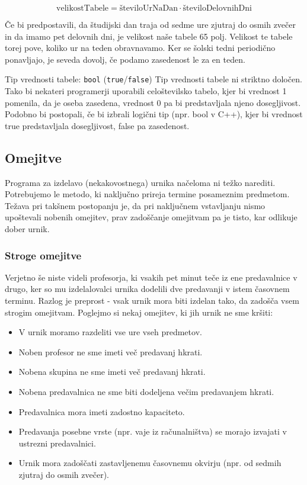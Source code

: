\documentclass[10pt,a4paper]{article}
\begin{document}
\[
\text{velikostTabele} = \text{številoUrNaDan} \cdot \text{številoDelovnihDni}
\]


Če bi predpostavili, da študijski dan traja od sedme ure zjutraj do osmih zvečer in da
imamo pet delovnih dni, je velikost naše tabele 65 polj. Velikost te tabele torej pove,
koliko ur na teden obravnavamo. Ker se šolski tedni periodično ponavljajo, je seveda
dovolj, če podamo zasedenost le za en teden.


Tip vrednosti tabele: \texttt{bool} (\texttt{true}/\texttt{false})
Tip vrednosti tabele ni striktno določen. Tako bi nekateri programerji uporabili
celoštevilsko tabelo, kjer bi vrednost 1 pomenila, da je oseba zasedena, vrednost 0
pa bi predstavljala njeno dosegljivost. Podobno bi postopali, če bi izbrali logični
tip (npr. bool v C++), kjer bi vrednost true predstavljala
dosegljivost, false pa zasedenost.

\subsection{Omejitve} %

Programa za izdelavo (nekakovostnega) urnika načeloma ni težko narediti. Potrebujemo
le metodo, ki naključno prireja termine posameznim predmetom. Težava pri takšnem postopanju
je, da pri naključnem vstavljanju nismo upoštevali nobenih omejitev, prav zadoščanje omejitvam
pa je tisto, kar odlikuje dober urnik.

\subsubsection{Stroge omejitve} %

Verjetno še niste videli profesorja, ki vsakih pet minut teče iz ene predavalnice v drugo,
ker so mu izdelalovalci urnika dodelili dve predavanji v istem časovnem terminu. Razlog
je preprost - vsak urnik mora biti izdelan tako, da zadošča vsem strogim omejitvam.
Poglejmo si nekaj omejitev, ki jih urnik ne sme kršiti:

\begin{itemize}
 \item   V urnik moramo razdeliti vse ure vseh predmetov.
 \item   Noben profesor ne sme imeti več predavanj hkrati.
 \item   Nobena skupina ne sme imeti več predavanj hkrati.
 \item   Nobena predavalnica ne sme biti dodeljena večim predavanjem hkrati.
 \item   Predavalnica mora imeti zadostno kapaciteto.
 \item   Predavanja posebne vrste (npr. vaje iz računalništva) se morajo izvajati v ustrezni predavalnici.
 \item   Urnik mora zadoščati zastavljenemu časovnemu okvirju (npr. od sedmih zjutraj do osmih zvečer).

\end{itemize}
\end{document}
